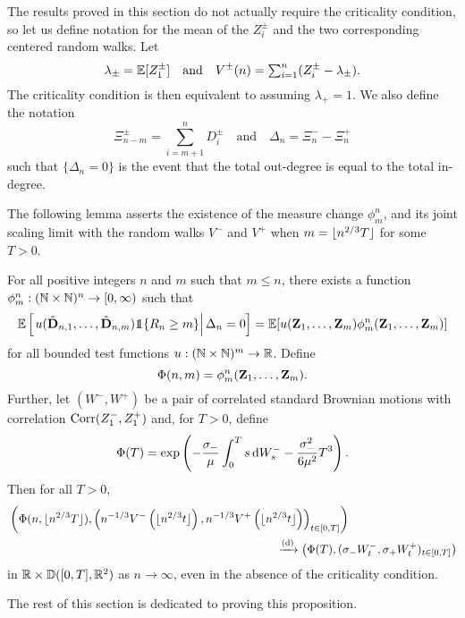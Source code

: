 The results proved in this section do not actually require the criticality condition, so let us define notation for the mean of the $Z_i^{\pm}$ and the two corresponding centered random walks. Let
\begin{equation*}
    \lambda_{\pm} = {\mathbb E}[Z^{\pm}_1]
    \quad \text{and} \quad
    V^{\pm}(n) = \textstyle \sum_{i=1}^n (Z^{\pm}_i - \lambda_{\pm}).
\end{equation*}
The criticality condition is then equivalent to assuming $\lambda_+ = 1$. We also define the notation
\begin{equation*}
    \Xi^{\pm}_{n-m} = \sum_{i=m+1}^n D_i^{\pm}
    \quad \text{and} \quad
    \Delta_n = \Xi^-_n - \Xi^+_n
\end{equation*}
such that $\{\Delta_n = 0\}$ is the event that the total out-degree is equal to the total in-degree.

The following lemma asserts the existence of the measure change $\phi^n_m$, and its joint scaling limit with the random walks $V^-$ and $V^+$ when $m = \lfloor n^{2/3} T\rfloor$ for some $T > 0$.
\begin{proposition}
    \label{prop:measure-change-no-crit}
    For all positive integers $n$ and $m$ such that $m \leq n$, there exists a function $\phi^n_m: ({\mathbb N} \times {\mathbb N})^n \to [0, \infty)$ such that 
    \begin{equation*}
        \E\left[\left.u(\hat{\vD}_{n, 1}, \ldots, \hat{\vD}_{n, m}) \one\{R_n \geq m\} \right| \Delta_n = 0\right]
        = \E[u(\vZ_1, \ldots, \vZ_m) \phi^n_m(\vZ_1, \ldots, \vZ_m)]
    \end{equation*}
    for all bounded test functions $u: ({\mathbb N} \times {\mathbb N})^m \to {\mathbb R}$. Define
    \begin{equation*}
        \Phi(n, m) = \phi^n_m({\mathbf Z}_1, \ldots, {\mathbf Z}_m).
    \end{equation*}
    Further, let $(W^-, W^+)$ be a pair of correlated standard Brownian motions with correlation $\operatorname{Corr}(Z_1^-, Z_1^+)$ and, for $T > 0$, define
    \begin{equation*}
        \Phi(T) = \exp\left( 
            - \frac{\sigma_-}{\mu} \int_0^T s \mathop{}\!\mathrm{d} W_s^- 
            - \frac{\sigma_-^2}{6 \mu^2} T^3
        \right).
    \end{equation*}
    Then for all $T > 0$,
    \begin{align*}
        &\left( 
            \Phi(n, \floor{n^{2/3} T}),
            \left(
                n^{-1/3} V^-\left( \floor{n^{2/3} t} \right),
                n^{-1/3} V^+\left( \floor{n^{2/3} t} \right)
            \right)_{t \in [0, T]}
        \right) \\
        & \hspace{23em} \todist \left( 
            \Phi(T),
            (\sigma_- W^-_t, \sigma_+ W^+_t)_{t \in [0, T]}
        \right)
    \end{align*}
    in ${\mathbb R} \times {\mathbb D}([0, T], {\mathbb R}^2)$ as $n \to \infty$, even in the absence of the criticality condition.
\end{proposition}
The rest of this section is dedicated to proving this proposition.

